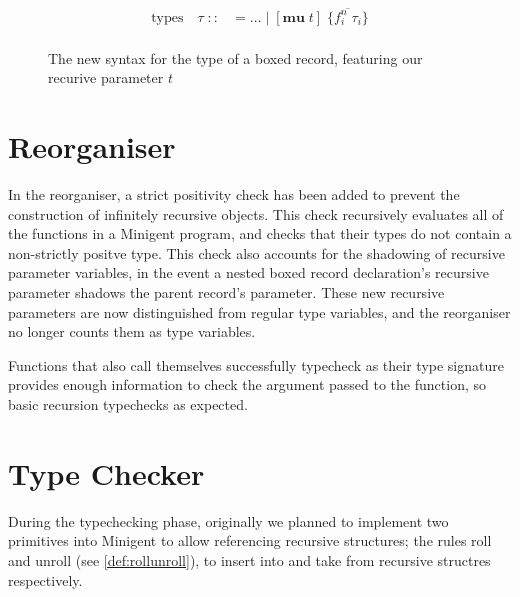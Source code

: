 \begin{figure}
    \centering
    \begin{align*}
        \text{types}\quad \tau\;
            ::&= \dots\; |\; [\textbf{mu}\; t]\; \{ \overline{f_i^n\; \tau_i} \} \\
    \end{align*}
    \caption{The new syntax for the type of a boxed record, featuring our recurive parameter $t$}
    \label{fig:recursivetypegrammar}
\end{figure}


\section{Reorganiser}

In the reorganiser, a strict positivity check has been added to prevent the construction of infinitely
recursive objects. This check recursively evaluates  all of the functions in a Minigent program, and
checks that their types do not contain a non-strictly positve type. This check also accounts for the
shadowing of recursive parameter variables, in the event a nested boxed record declaration's recursive
parameter shadows the parent record's parameter. These new recursive parameters are now distinguished from
regular type variables, and the reorganiser no longer counts them as type variables.

Functions that also call themselves successfully typecheck as their type signature provides enough information
to check the argument passed to the function, so basic recursion typechecks as expected.


\section{Type Checker}
\label{sec:typecheckingprogress}

During the typechecking phase, originally we planned to implement two primitives into Minigent to allow referencing
recursive structures; the rules \textsf{roll} and \textsf{unroll} (see \autoref{def:rollunroll}), to insert into and take from recursive structres respectively.

